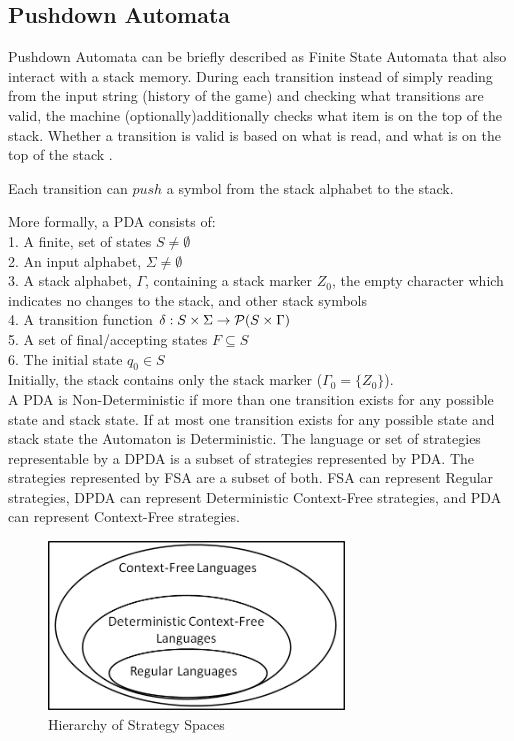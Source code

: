 \documentclass[a4paper,11pt,bcshonoursthesis,singlespace,oneside,thesisdraft,pdflatex]{cssethesis}
\begin{document}
\subsection{Pushdown Automata}
Pushdown Automata can be briefly described as Finite State Automata that also interact with a stack memory. During each transition instead of simply reading from the input string (history of the game) and checking what transitions are valid, the machine (optionally)additionally checks what item is on the top of the stack. 
Whether a transition is valid is based on what is read, and what is on the top of the stack \citep[][pp 99 -- 122]{Sipser2006}. 

Each transition can $push$ a symbol from the stack alphabet to the stack. 

More formally, a PDA consists of:\\
1. A finite, set of states $S \neq  \emptyset$\\
2. An input alphabet, $\Sigma \neq  \emptyset$\\
3. A stack alphabet, $\Gamma$, containing a stack marker $Z_0$, the empty character which indicates no changes to the stack, and other stack symbols\\
4. A transition function $\delta : S \times \Sigma \time \Gamma \rightarrow \mathcal P(S \times \Gamma)$\\
5. A set of final/accepting states $F \subseteq S$ \\
6. The initial state $q_0 \in S$\\

Initially, the stack contains only the stack marker ($\Gamma_0=\{Z_0\}$).\\

A PDA is Non-Deterministic if more than one transition exists for any possible state and stack state.  If at most one transition exists for any possible state and stack state the Automaton is Deterministic. The language or set of strategies representable by a DPDA is a subset of strategies represented by PDA. The strategies represented by FSA are a subset of both. FSA can represent Regular strategies, DPDA can represent Deterministic Context-Free strategies, and PDA can represent Context-Free strategies.

\begin{figure}[h]
\centering
\includegraphics[width=0.7\textwidth]{languages}
\caption{Hierarchy of Strategy Spaces}
\label{fig:languages}
\end{figure}
\end{document}
